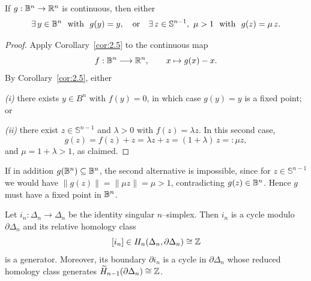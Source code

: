 \begin{corollary}\label{cor:2.12}
If $g:\mathbb{B}^n\to\Bbb R^n$ is continuous, then either
\[
\exists\,y\in \B^n\ \text{ with }\ g(y)=y,
\quad\text{or}\quad
\exists\,z\in \mathbb{S}^{n-1},\ \mu>1\ \text{ with }\ g(z)=\mu\,z .
\]
\end{corollary}

\begin{proof}
Apply Corollary~\ref{cor:2.5} to the continuous map
\[
f:\mathbb{B}^n\longrightarrow\Bbb R^n,\qquad x \mapsto g(x)-x .
\]
By Corollary~\ref{cor:2.5}, either

\smallskip
\emph{(i)} there exists $y\in B^n$ with $f(y)=0$, in which case $g(y)=y$ is a fixed point; or

\smallskip
\emph{(ii)} there exist $z\in \mathbb{S}^{n-1}$ and $\lambda>0$ with $f(z)=\lambda z$.
In this second case,
\[
g(z)=f(z)+z=\lambda z+z=(1+\lambda)\,z=: \mu z,
\]
and $\mu=1+\lambda>1$, as claimed.
\end{proof}

\begin{remark}\label{remark 2.13}
If in addition $g(\mathbb{B}^n)\subseteq \mathbb{B}^n$, the second alternative is impossible, since
for $z\in \mathbb{S}^{n-1}$ we would have $\|g(z)\|=\|\mu z\|=\mu>1$, contradicting
$g(z)\in \mathbb{B}^n$. Hence $g$ must have a fixed point in $\mathbb{B}^n$.
\end{remark}

\begin{proposition}\label{prop:fundamental-cycle}
Let $i_n:\Delta_n\to\Delta_n$ be the identity singular $n$–simplex.
Then $i_n$ is a cycle modulo $\partial \Delta_n$ and its relative homology class
\[
[i_n]\in H_n(\Delta_n,\partial \Delta_n)\cong \Bbb Z
\]
is a generator. Moreover, its boundary $\partial i_n$ is a cycle in
$\partial \Delta_n$ whose reduced homology class generates
$\widetilde H_{n-1}(\partial \Delta_n)\cong\Bbb Z$.
\end{proposition}

